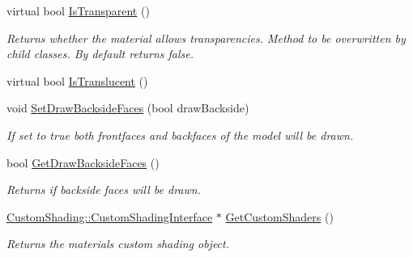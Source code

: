 \begin{DoxyCompactItemize}
\mbox{\label{class_geometry_engine_1_1_geometry_material_1_1_material_a63516b0a00dd39776f782ef0359b324e}} 
virtual bool \mbox{\hyperlink{class_geometry_engine_1_1_geometry_material_1_1_material_a63516b0a00dd39776f782ef0359b324e}{Is\+Transparent}} ()
\begin{DoxyCompactList}\small\item\em Returns whether the material allows transparencies. Method to be overwritten by child classes. By default returns false. \end{DoxyCompactList}\item 
virtual bool \mbox{\hyperlink{class_geometry_engine_1_1_geometry_material_1_1_material_ab8c9af9c6cbd2b4a8ad64f3a80702402}{Is\+Translucent}} ()
\item 
\mbox{\label{class_geometry_engine_1_1_geometry_material_1_1_material_a71103b83294e7c3752ecfe6cf4427e72}} 
void \mbox{\hyperlink{class_geometry_engine_1_1_geometry_material_1_1_material_a71103b83294e7c3752ecfe6cf4427e72}{Set\+Draw\+Backside\+Faces}} (bool draw\+Backside)
\begin{DoxyCompactList}\small\item\em If set to true both frontfaces and backfaces of the model will be drawn. \end{DoxyCompactList}\item 
\mbox{\label{class_geometry_engine_1_1_geometry_material_1_1_material_a85013da84d4416af919d1755706aeb13}} 
bool \mbox{\hyperlink{class_geometry_engine_1_1_geometry_material_1_1_material_a85013da84d4416af919d1755706aeb13}{Get\+Draw\+Backside\+Faces}} ()
\begin{DoxyCompactList}\small\item\em Returns if backside faces will be drawn. \end{DoxyCompactList}\item 
\mbox{\label{class_geometry_engine_1_1_geometry_material_1_1_material_a3c2292d28141f329c0c7befb12de07ac}} 
\mbox{\hyperlink{class_geometry_engine_1_1_custom_shading_1_1_custom_shading_interface}{Custom\+Shading\+::\+Custom\+Shading\+Interface}} $\ast$ \mbox{\hyperlink{class_geometry_engine_1_1_geometry_material_1_1_material_a3c2292d28141f329c0c7befb12de07ac}{Get\+Custom\+Shaders}} ()
\begin{DoxyCompactList}\small\item\em Returns the material\textquotesingle{}s custom shading object. \end{DoxyCompactList}\end{DoxyCompactItemize}
